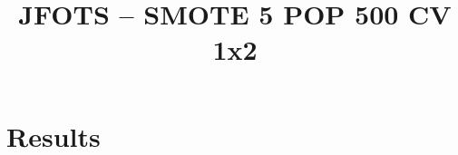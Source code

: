\documentclass{llncs}
\title{JFOTS -- SMOTE 5 POP 500 CV 1x2}
\begin{document}
\maketitle

\section{Results}
















\end{document}
